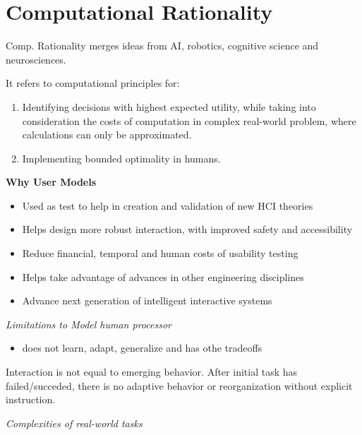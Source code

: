 \section{Computational Rationality}

Comp. Rationality merges ideas from AI, robotics, cognitive science and neurosciences. 

It refers to computational principles for:
\begin{enumerate}[itemsep=-5pt, topsep=0pt, leftmargin=*]
    \item Identifying decisions with highest expected utility, while taking into consideration the costs of computation in complex real-world problem, where calculations can only be approximated.
    \item Implementing bounded optimality in humans. 
\end{enumerate}

\textbf{Why User Models}

\begin{itemize}[itemsep=-5pt, topsep=0pt, leftmargin=*]
	\item Used as test to help in creation and validation of new HCI theories
	\item Helps design more robust interaction, with improved safety and accessibility
	\item Reduce financial, temporal and human costs of usability testing
	\item Helps take advantage of advances in other engineering disciplines
	\item Advance next generation of intelligent interactive systems
\end{itemize}

\textit{Limitations to Model human processor} \smallskip

\begin{itemize}[itemsep=-5pt, topsep=0pt, leftmargin=*]
	\item does not learn, adapt, generalize and has othe tradeoffs
\end{itemize}
Interaction is not equal to emerging behavior. After initial task has failed/succeded, there is no adaptive behavior or reorganization without explicit instruction.

\textit{Complexities of real-world tasks} \smallskip

